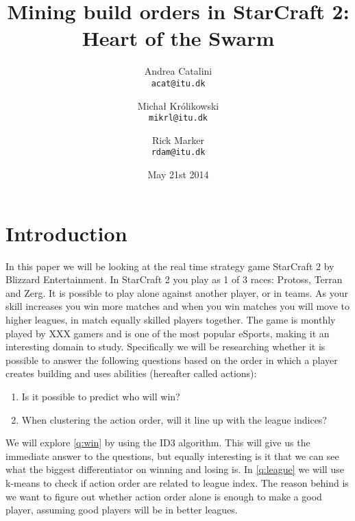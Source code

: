 \documentclass[a4paper,11pt]{article}
\begin{document}
\graphicspath{ {./images/} }
\date{May 21st 2014}
\title{Mining build orders in StarCraft 2: Heart of the Swarm}

\author{Andrea Catalini\\
\texttt{acat@itu.dk}
\and Michał Królikowski\\
\texttt{mikrl@itu.dk}
\and Rick Marker\\
\texttt{rdam@itu.dk}}

\clearpage\maketitle
\thispagestyle{empty}
\setcounter{page}{1}
\begin{abstract}

\end{abstract}


\section{Introduction}
In this paper we will be looking at the real time strategy game StarCraft 2 by Blizzard Entertainment. 
In StarCraft 2 you play as 1 of 3 races: Protoss, Terran and Zerg. It is possible to play alone against another player, or in teams. As your skill increases you win more matches and when you win matches you will move to higher leagues, in match equally skilled players together. The game is monthly played by XXX gamers and is one of the most popular eSports, making it an interesting domain to study.
Specifically we will be researching whether it is possible to answer the following questions based on the order in which a player creates building and uses abilities (hereafter called actions):
\begin{enumerate}
\item Is it possible to predict who will win?\label{q:win}
\item When clustering the action order, will it line up with the league indices?\label{q:league}
\end{enumerate}

We will explore \ref{q:win} by using the ID3 algorithm. This will give us the immediate answer to the questions, but equally interesting is it that we can see what the biggest differentiator on winning and losing is. In \ref{q:league} we will use k-means  to check if action order are related to league index. The reason behind is we want to figure out whether action order alone is enough to make a good player, assuming good players will be in better leagues.
\end{document}
